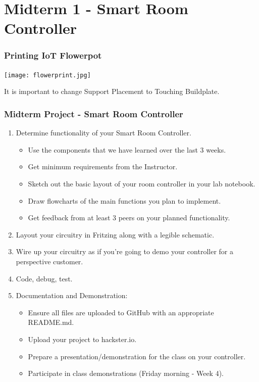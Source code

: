 \documentclass{beamer}
\begin{document}
\section{Midterm 1 - Smart Room Controller}


\begin{frame}\frametitle{Printing IoT Flowerpot}
\begin{center}
\texttt{[image: flowerprint.jpg]}
\end{center}

\vspace{0.25cm}
It is important to change Support Placement to Touching Buildplate.
\end{frame}


\begin{frame}\frametitle{Midterm Project - Smart Room Controller}
\begin{enumerate}
\item Determine functionality of your Smart Room Controller.
	\begin{itemize}
	\item Use the components that we have learned over the last 3 weeks.
	\item Get minimum requirements from the Instructor. 
	\item Sketch out the basic layout of your room controller in your lab notebook.
	\item Draw flowcharts of the main functions you plan to implement.
	\item Get feedback from at least 3 peers on your planned functionality. 
	\end{itemize}
\item Layout your circuitry in Fritzing along with a legible schematic.
\item Wire up your circuitry as if you're going to demo your controller for a perspective customer. 
\item Code, debug, test.
\item Documentation and Demonstration:
	\begin{itemize}
	\item Ensure all files are uploaded to GitHub with an appropriate README.md.
	\item Upload your project to hackster.io.
	\item Prepare a presentation/demonstration for the class on your controller.
	\item Participate in class demonstrations (Friday morning - Week 4).
	\end{itemize}
\end{enumerate}
\end{frame}
\end{document}
